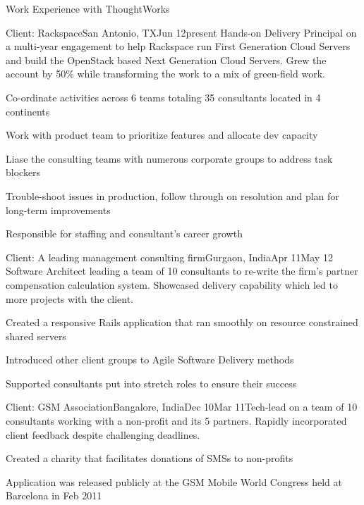 \documentclass{resume} %
\begin{document}
\begin{rSection}{Work Experience with ThoughtWorks}

\begin{rSubsection}{Client: Rackspace}{San Antonio, TX}{Jun
    12}{present}
{Hands-on Delivery Principal on a multi-year engagement to help Rackspace run
  First Generation Cloud Servers and build the OpenStack based Next
  Generation Cloud Servers. Grew the account by 50\% while
  transforming the work to a mix of green-field work.}

\item Co-ordinate activities across 6 teams
  totaling 35 consultants located in 4 continents
\item Work with product team to prioritize features and allocate dev capacity
\item Liase the consulting teams with numerous corporate groups to address task blockers
\item Trouble-shoot issues in production, follow
  through on resolution and plan for long-term improvements
\item Responsible for staffing and consultant's career growth
\end{rSubsection}


\begin{rSubsection}{Client: A leading management consulting
    firm}{Gurgaon, India}{Apr 11}{May 12}
{Software Architect leading a team of 10 consultants to re-write the
  firm's partner compensation calculation system. Showcased delivery
  capability which led to more projects with the client.}

\item Created a responsive Rails application that ran smoothly on resource constrained shared servers
\item Introduced other client groups to Agile Software Delivery
  methods
\item Supported consultants put into stretch roles to ensure their
  success
\end{rSubsection}


\begin{rSubsection}{Client: GSM Association}{Bangalore, India}{Dec 10}{Mar 11}{Tech-lead on a team of 10 consultants working with a non-profit
  and its 5 partners. Rapidly incorporated client feedback despite
  challenging deadlines.}
\item Created a charity that facilitates donations of SMSs to non-profits
\item Application was released publicly at the GSM Mobile World Congress held at Barcelona in Feb 2011
\end{rSubsection}



\end{rSection}
\end{document}

